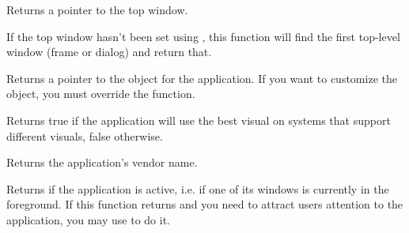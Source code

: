 
Returns a pointer to the top window.


If the top window hasn't been set using , this
function will find the first top-level window (frame or dialog) and return that.





\label{wxappgettraits}


Returns a pointer to the  object for the application.
If you want to customize the  object, you must override the
 function.



\label{wxappgetusebestvisual}


Returns true if the application will use the best visual on systems that support
different visuals, false otherwise.




\label{wxappgetvendorname}


Returns the application's vendor name.


\label{wxappisactive}


Returns \true if the application is active, i.e. if one of its windows is
currently in the foreground. If this function returns \false and you need to
attract users attention to the application, you may use 
to do it.


\label{wxappismainlooprunning}



